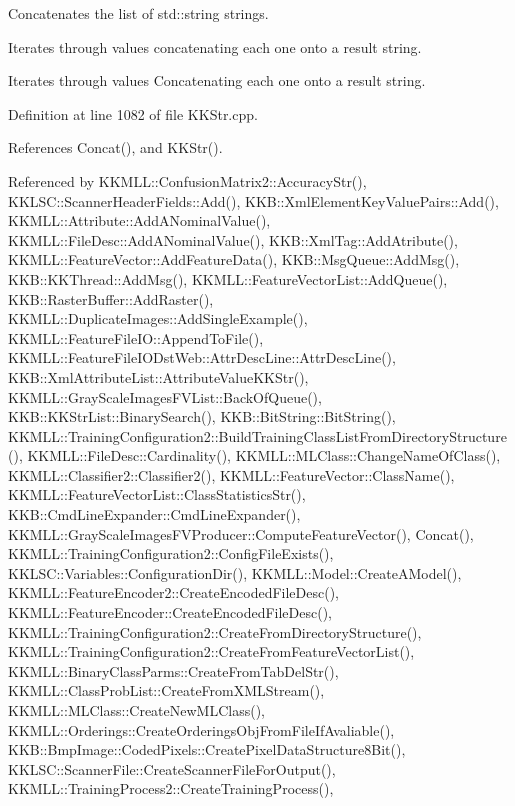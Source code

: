 Concatenates the list of \textquotesingle{}std\+::string\textquotesingle{} strings. 

Iterates through values concatenating each one onto a result string.

Iterates through values Concatenating each one onto a result string. 

Definition at line 1082 of file K\+K\+Str.\+cpp.



References Concat(), and K\+K\+Str().



Referenced by K\+K\+M\+L\+L\+::\+Confusion\+Matrix2\+::\+Accuracy\+Str(), K\+K\+L\+S\+C\+::\+Scanner\+Header\+Fields\+::\+Add(), K\+K\+B\+::\+Xml\+Element\+Key\+Value\+Pairs\+::\+Add(), K\+K\+M\+L\+L\+::\+Attribute\+::\+Add\+A\+Nominal\+Value(), K\+K\+M\+L\+L\+::\+File\+Desc\+::\+Add\+A\+Nominal\+Value(), K\+K\+B\+::\+Xml\+Tag\+::\+Add\+Atribute(), K\+K\+M\+L\+L\+::\+Feature\+Vector\+::\+Add\+Feature\+Data(), K\+K\+B\+::\+Msg\+Queue\+::\+Add\+Msg(), K\+K\+B\+::\+K\+K\+Thread\+::\+Add\+Msg(), K\+K\+M\+L\+L\+::\+Feature\+Vector\+List\+::\+Add\+Queue(), K\+K\+B\+::\+Raster\+Buffer\+::\+Add\+Raster(), K\+K\+M\+L\+L\+::\+Duplicate\+Images\+::\+Add\+Single\+Example(), K\+K\+M\+L\+L\+::\+Feature\+File\+I\+O\+::\+Append\+To\+File(), K\+K\+M\+L\+L\+::\+Feature\+File\+I\+O\+Dst\+Web\+::\+Attr\+Desc\+Line\+::\+Attr\+Desc\+Line(), K\+K\+B\+::\+Xml\+Attribute\+List\+::\+Attribute\+Value\+K\+K\+Str(), K\+K\+M\+L\+L\+::\+Gray\+Scale\+Images\+F\+V\+List\+::\+Back\+Of\+Queue(), K\+K\+B\+::\+K\+K\+Str\+List\+::\+Binary\+Search(), K\+K\+B\+::\+Bit\+String\+::\+Bit\+String(), K\+K\+M\+L\+L\+::\+Training\+Configuration2\+::\+Build\+Training\+Class\+List\+From\+Directory\+Structure(), K\+K\+M\+L\+L\+::\+File\+Desc\+::\+Cardinality(), K\+K\+M\+L\+L\+::\+M\+L\+Class\+::\+Change\+Name\+Of\+Class(), K\+K\+M\+L\+L\+::\+Classifier2\+::\+Classifier2(), K\+K\+M\+L\+L\+::\+Feature\+Vector\+::\+Class\+Name(), K\+K\+M\+L\+L\+::\+Feature\+Vector\+List\+::\+Class\+Statistics\+Str(), K\+K\+B\+::\+Cmd\+Line\+Expander\+::\+Cmd\+Line\+Expander(), K\+K\+M\+L\+L\+::\+Gray\+Scale\+Images\+F\+V\+Producer\+::\+Compute\+Feature\+Vector(), Concat(), K\+K\+M\+L\+L\+::\+Training\+Configuration2\+::\+Config\+File\+Exists(), K\+K\+L\+S\+C\+::\+Variables\+::\+Configuration\+Dir(), K\+K\+M\+L\+L\+::\+Model\+::\+Create\+A\+Model(), K\+K\+M\+L\+L\+::\+Feature\+Encoder2\+::\+Create\+Encoded\+File\+Desc(), K\+K\+M\+L\+L\+::\+Feature\+Encoder\+::\+Create\+Encoded\+File\+Desc(), K\+K\+M\+L\+L\+::\+Training\+Configuration2\+::\+Create\+From\+Directory\+Structure(), K\+K\+M\+L\+L\+::\+Training\+Configuration2\+::\+Create\+From\+Feature\+Vector\+List(), K\+K\+M\+L\+L\+::\+Binary\+Class\+Parms\+::\+Create\+From\+Tab\+Del\+Str(), K\+K\+M\+L\+L\+::\+Class\+Prob\+List\+::\+Create\+From\+X\+M\+L\+Stream(), K\+K\+M\+L\+L\+::\+M\+L\+Class\+::\+Create\+New\+M\+L\+Class(), K\+K\+M\+L\+L\+::\+Orderings\+::\+Create\+Orderings\+Obj\+From\+File\+If\+Avaliable(), K\+K\+B\+::\+Bmp\+Image\+::\+Coded\+Pixels\+::\+Create\+Pixel\+Data\+Structure8\+Bit(), K\+K\+L\+S\+C\+::\+Scanner\+File\+::\+Create\+Scanner\+File\+For\+Output(), K\+K\+M\+L\+L\+::\+Training\+Process2\+::\+Create\+Training\+Process(), 